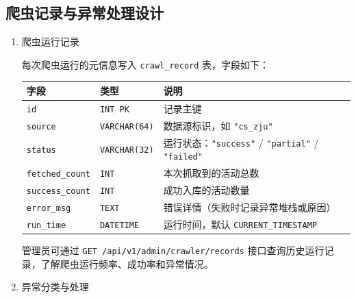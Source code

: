 \documentclass[UTF8,a4paper,12pt,fontset=none]{ctexrep}
\newcounter{none}
\begin{document}
\subsection{爬虫记录与异常处理设计}\label{ux722cux866bux8bb0ux5f55ux4e0eux5f02ux5e38ux5904ux7406ux8bbeux8ba1}

\begin{enumerate}
\def\labelenumi{\arabic{enumi}.}
\item
  爬虫运行记录

  每次爬虫运行的元信息写入 \texttt{crawl\_record} 表，字段如下：

  {\def\LTcaptype{none} %
  \begin{longtable}[]{@{}
    >{\raggedright\arraybackslash}p{}
    >{\raggedright\arraybackslash}p{}
    >{\raggedright\arraybackslash}p{}@{}}
  \toprule\noalign{}
  \begin{minipage}[b]{\linewidth}\raggedright
  字段
  \end{minipage} & \begin{minipage}[b]{\linewidth}\raggedright
  类型
  \end{minipage} & \begin{minipage}[b]{\linewidth}\raggedright
  说明
  \end{minipage} \\
  \midrule\noalign{}
  \endhead
  \bottomrule\noalign{}
  \endlastfoot
  \texttt{id} & \texttt{INT\ PK} & 记录主键 \\
  \texttt{source} & \texttt{VARCHAR(64)} & 数据源标识，如 \texttt{"cs\_zju"} \\
  \texttt{status} & \texttt{VARCHAR(32)} & 运行状态：\texttt{"success"} / \texttt{"partial"} / \texttt{"failed"} \\
  \texttt{fetched\_count} & \texttt{INT} & 本次抓取到的活动总数 \\
  \texttt{success\_count} & \texttt{INT} & 成功入库的活动数量 \\
  \texttt{error\_msg} & \texttt{TEXT} & 错误详情（失败时记录异常堆栈或原因） \\
  \texttt{run\_time} & \texttt{DATETIME} & 运行时间，默认 \texttt{CURRENT\_TIMESTAMP} \\
  \end{longtable}
  }

  管理员可通过 \texttt{GET\ /api/v1/admin/crawler/records} 接口查询历史运行记录，了解爬虫运行频率、成功率和异常情况。
\item
  异常分类与处理


\end{enumerate}
\end{document}
